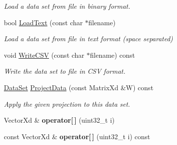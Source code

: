 \begin{DoxyCompactItemize}
\begin{DoxyCompactList}\small\item\em Load a data set from file in binary format. \end{DoxyCompactList}\item 
\hypertarget{struct_d_r_d_s_p_1_1_data_set_a9caf2a2c685f1433028de6d3c11bd758}{bool \hyperlink{struct_d_r_d_s_p_1_1_data_set_a9caf2a2c685f1433028de6d3c11bd758}{Load\-Text} (const char $\ast$filename)}\label{struct_d_r_d_s_p_1_1_data_set_a9caf2a2c685f1433028de6d3c11bd758}

\begin{DoxyCompactList}\small\item\em Load a data set from file in text format (space separated) \end{DoxyCompactList}\item 
\hypertarget{struct_d_r_d_s_p_1_1_data_set_a1d90f86c1fbe0380d91158b1c050c501}{void \hyperlink{struct_d_r_d_s_p_1_1_data_set_a1d90f86c1fbe0380d91158b1c050c501}{Write\-C\-S\-V} (const char $\ast$filename) const }\label{struct_d_r_d_s_p_1_1_data_set_a1d90f86c1fbe0380d91158b1c050c501}

\begin{DoxyCompactList}\small\item\em Write the data set to file in C\-S\-V format. \end{DoxyCompactList}\item 
\hypertarget{struct_d_r_d_s_p_1_1_data_set_a0f42640d4f826807b69830bf3617152c}{\hyperlink{struct_d_r_d_s_p_1_1_data_set}{Data\-Set} \hyperlink{struct_d_r_d_s_p_1_1_data_set_a0f42640d4f826807b69830bf3617152c}{Project\-Data} (const Matrix\-Xd \&W) const }\label{struct_d_r_d_s_p_1_1_data_set_a0f42640d4f826807b69830bf3617152c}

\begin{DoxyCompactList}\small\item\em Apply the given projection to this data set. \end{DoxyCompactList}\item 
\hypertarget{struct_d_r_d_s_p_1_1_data_set_ae82340f4e02cb4ca434dc9361716eef0}{Vector\-Xd \& {\bfseries operator\mbox{[}$\,$\mbox{]}} (uint32\-\_\-t i)}\label{struct_d_r_d_s_p_1_1_data_set_ae82340f4e02cb4ca434dc9361716eef0}

\item 
\hypertarget{struct_d_r_d_s_p_1_1_data_set_a1349d1989fe1292e4c8e7ce4eb105b6c}{const Vector\-Xd \& {\bfseries operator\mbox{[}$\,$\mbox{]}} (uint32\-\_\-t i) const }\label{struct_d_r_d_s_p_1_1_data_set_a1349d1989fe1292e4c8e7ce4eb105b6c}

\end{DoxyCompactItemize}
